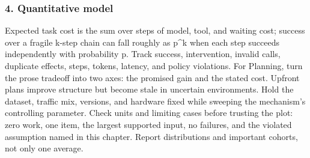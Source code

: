 \subsubsection*{4. Quantitative model}
Expected task cost is the sum over steps of model, tool, and waiting cost; success over a fragile k-step chain can fall roughly as p\textasciicircum{}k when each step succeeds independently with probability p. Track success, intervention, invalid calls, duplicate effects, steps, tokens, latency, and policy violations.
For Planning, turn the prose tradeoff into two axes: the promised gain and the stated cost. Upfront plans improve structure but become stale in uncertain environments. Hold the dataset, traffic mix, versions, and hardware fixed while sweeping the mechanism's controlling parameter.
Check units and limiting cases before trusting the plot: zero work, one item, the largest supported input, no failures, and the violated assumption named in this chapter. Report distributions and important cohorts, not only one average.
